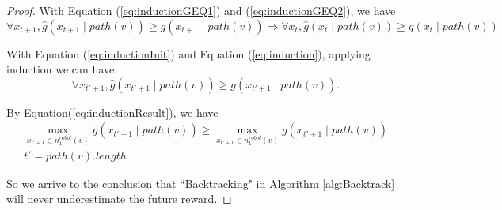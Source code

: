 \documentclass[12pt]{article}
\begin{document}
\begin{propty}
\begin{proof}
With Equation (\ref{eq:inductionGEQ1}) and (\ref{eq:inductionGEQ2}), we have
\begin{equation}
\label{eq:induction}
\forall x_{t+1}, \hat{g}(x_{t+1} \mid path(v)) \geq g(x_{t+1} \mid path(v)) \Rightarrow  \forall x_{t}, \hat{g}(x_{t} \mid path(v)) \geq g(x_{t} \mid path(v))
\end{equation}

With Equation (\ref{eq:inductionInit}) and Equation (\ref{eq:induction}), applying induction we can have
\begin{equation}
\label{eq:inductionResult}
\forall x_{t'+1}, \hat{g}(x_{t'+1} \mid path(v)) \geq g(x_{t'+1} \mid path(v)).
\end{equation}

By Equation(\ref{eq:inductionResult}), we have
\begin{equation}
\begin{aligned}
\max_{x_{t'+1} \in n^{robot}_{1}(v)} \hat{g}(x_{t'+1} \mid path(v)) \geq \max_{x_{t'+1} \in n^{robot}_{1}(v)} g(x_{t'+1} \mid path(v)) \\
t' = path(v).length
\end{aligned}
\end{equation}

So we arrive to the conclusion that ``Backtracking" in Algorithm \ref{alg:Backtrack} will never underestimate the future reward.




\end{proof}
\end{propty}

\end{document}
